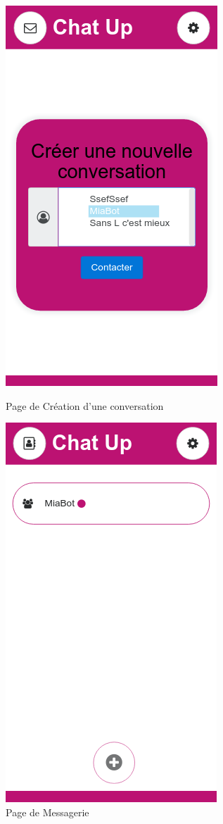 \begin{figure}[H]
   \begin{minipage}[c]{.46\linewidth}
		\centering \includegraphics[scale=0.5]{img/03ChoixMsg.png}
		\caption{Page de Création d'une conversation}
   \end{minipage} \hfill
   \begin{minipage}[c]{.46\linewidth}
		\centering \includegraphics[scale=0.5]{img/05HistoriqueMessagerie.png}
		\caption{Page de Messagerie}
   \end{minipage}
\end{figure}

